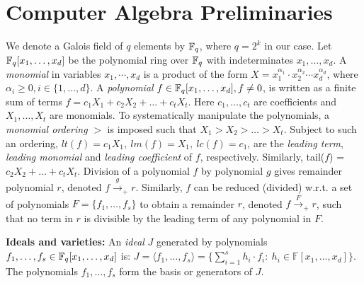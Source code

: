 \section{Computer Algebra Preliminaries}
\label{sec:ideals}


We denote a Galois field of $q$ elements by ${\mathbb{F}}_{q}$, where $q = 2^k$ in
our case. Let ${\mathbb{F}}_{q}[x_1,\dots, x_d]$ be
the polynomial ring over ${\mathbb{F}}_{q}$ with indeterminates $x_1, \dots, 
x_d$. A {\it monomial} in variables $x_1, \cdots, x_d$ is a product of
the form $X = x_1^{\alpha_{1}}\cdot x_2^{\alpha_{2}}\cdots
x_d^{\alpha_{d}}$, where $\alpha_i \geq 0, i\in \{1, \dots, d\}$. A
{\it polynomial} $f \in {\mathbb{F}}_{q}[x_1,\dots, x_d], f\neq 0$, is 
written as a finite sum of terms $f = c_1 X_1 + c_2 X_2 + \dots + c_t
X_t$.  Here $c_1, \dots, c_t$ are coefficients and $X_1, \dots, X_t$
are monomials. To systematically manipulate the polynomials, a {\it
  monomial  ordering} $>$ is imposed such that $X_1 > X_2 > \dots >
X_t$. 
Subject to such an ordering, $lt(f) = c_1 X_1,  ~lm(f) = X_1, ~lc(f) =
c_1$, are the {\it leading   term}, {\it  leading monomial} and {\it
  leading coefficient} of $f$, respectively. Similarly, tail($f$) =
$c_2X_2 + \dots + c_t X_t$. Division of a polynomial $f$ by polynomial
$g$ gives remainder polynomial $r$, denoted $f \xrightarrow{g}_+ r$.
Similarly, $f$ can be reduced (divided) w.r.t. a set of polynomials
$F = \{f_1, \dots, f_s\}$ to obtain a remainder $r$, denoted $f
\stackrel{F} {\textstyle \longrightarrow}_+ r$, such that no term in
$r$ is divisible by the leading term of any polynomial in $F$.  


{\bf Ideals and varieties:} An {\it ideal} $J$ generated by
polynomials $f_1, \dots, f_s \in {\mathbb{F}}_{q}[x_1,\dots, x_d]$ is:
$J = \langle f_1, \dots, f_s \rangle = \{\sum_{i=1}^{s}
h_i\cdot f_i: ~h_i \in \mathbb{F}[x_1,\dots,  x_d]\}.$  The
polynomials $f_1, \dots, f_s$ form the basis or generators of
$J$. 

